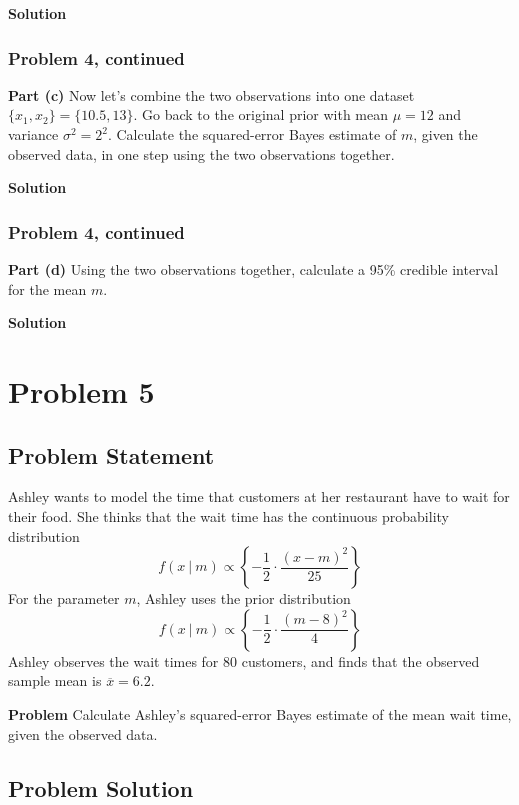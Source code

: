 \documentclass[12pt]{article}
\theoremstyle{definition}
\begin{document}
\bigskip
\noindent
{\bf Solution} 




\newpage
\subsubsection*{Problem 4, continued}

\noindent
{\bf Part (c)} Now let's combine the two observations into one dataset $\{x_1, x_2\} = \{10.5, 13\}$. Go back to the original prior with mean $\mu = 12$ and variance $\sigma^2 = 2^2$. Calculate the squared-error Bayes estimate of $m$, given the observed data, in one step using the two observations together.

\bigskip
\noindent
{\bf Solution} 


\newpage
\subsubsection*{Problem 4, continued}

\noindent
{\bf Part (d)} Using the two observations together, calculate a 95\% credible interval for the mean $m$.

\bigskip
\noindent
{\bf Solution} 



\newpage
\section*{Problem 5}

\subsection*{Problem Statement}

Ashley wants to model the time that customers at her restaurant have to wait for their food. She thinks that the wait time has the continuous probability distribution
$$
f(x\ |\ m) \propto \left \{ - \frac{1}{2} \cdot \frac{ (x - m)^2}{25} \right \}
$$
For the parameter $m$, Ashley uses the prior distribution
$$
f(x\ |\ m) \propto \left \{ - \frac{1}{2} \cdot \frac{ (m - 8)^2}{4} \right \}
$$
Ashley observes the wait times for 80 customers, and finds that the observed sample mean is $\overline{x} = 6.2$.

\bigskip
\noindent
{\bf Problem} Calculate Ashley's squared-error Bayes estimate of the mean wait time, given the observed data.


\subsection*{Problem Solution}
\end{document}
